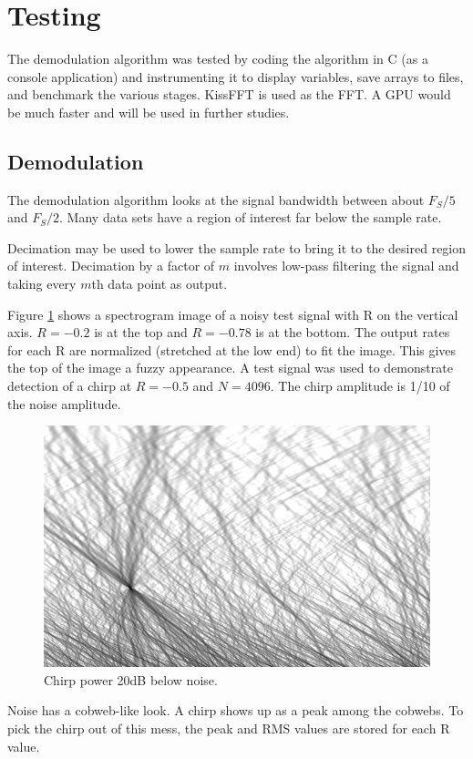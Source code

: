 \section{Testing}

The demodulation algorithm was tested by coding the algorithm in C (as a console
application) and instrumenting it to display variables,
save arrays to files, and benchmark the various stages.
KissFFT is used as the FFT. A GPU would be much faster and will be used in further studies.

\subsection{Demodulation}

The demodulation algorithm looks at the signal bandwidth between about
$F_S/5$ and $F_S/2$.
Many data sets have a region of interest far below the sample rate.

Decimation may be used to lower the sample rate to bring it to the
desired region of interest. 
Decimation by a factor of $m$ involves low-pass filtering the signal
and taking every $m$th data point as output.

Figure \ref{fig:chirpTest1} shows a spectrogram image of a noisy test signal with R on the vertical axis.
$R=-0.2$ is at the top and $R=-0.78$ is at the bottom.
The output rates for each R are normalized (stretched at the low end) to fit the image.
This gives the top of the image a fuzzy appearance.
A test signal was used to demonstrate detection of a chirp at $R=-0.5$ and $N=4096$.
The chirp amplitude is 1/10 of the noise amplitude.

\begin{figure}
  \includegraphics[width=\linewidth]{../source/chirp42m.jpg}
  \caption{Chirp power 20dB below noise.}
  \label{fig:chirpTest1}
\end{figure}

Noise has a cobweb-like look. A chirp shows up as a peak among the cobwebs.
To pick the chirp out of this mess, the peak and RMS values are stored for each R value.
